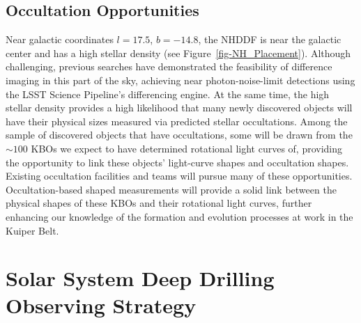\documentclass[modern,preprint]{aastex7}
\begin{document}
\subsection{Occultation Opportunities}
Near galactic coordinates $l=17.5$, $b=-14.8$, the NHDDF is near the galactic center and has a high stellar density (see Figure~\ref{fig-NH_Placement}).  Although challenging, previous searches \citep[e.g.][]{Fraser2024PSJ} have demonstrated the feasibility of difference imaging in this part of the sky, achieving near photon-noise-limit detections using the LSST Science Pipeline's differencing engine.
At the same time, the high stellar density provides a high likelihood that many newly discovered objects will have their physical sizes measured via predicted stellar occultations. Among the sample of discovered objects that have occultations, some will be drawn from the $\sim 100$ KBOs we expect to have determined rotational light curves of, providing the opportunity to link these objects' light-curve shapes and occultation shapes. Existing occultation facilities \cite[e.g.][]{RECON16} and teams will pursue many of these opportunities. Occultation-based shaped measurements will provide a solid link between the physical shapes of these KBOs and their rotational light curves, further enhancing our knowledge of the formation and evolution processes at work in the Kuiper Belt.

\section{Solar System Deep Drilling Observing Strategy\label{sec:strategy}}
\end{document}
